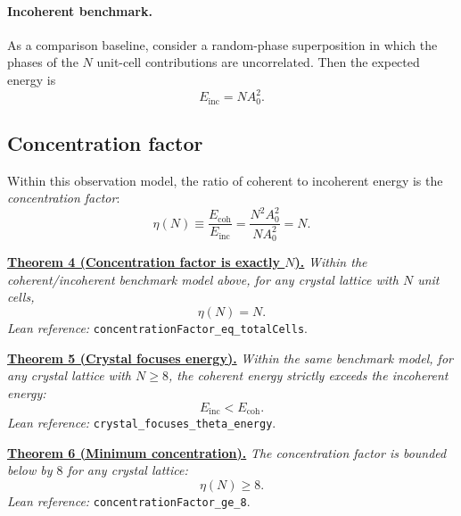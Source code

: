\documentclass[prb,twocolumn,nofootinbib,superscriptaddress]{revtex4-2}
\newcommand{\lean}[1]{\texttt{\small #1}}
\begin{document}
\paragraph{Incoherent benchmark.}
As a comparison baseline, consider a random-phase superposition in which the phases of the $N$ unit-cell contributions are uncorrelated.
Then the expected energy is
\begin{equation}
E_{\mathrm{inc}} = N A_0^2.
\label{eq:E_inc}
\end{equation}

\subsection{Concentration factor}

Within this observation model, the ratio of coherent to incoherent energy is the \emph{concentration factor}:
\begin{equation}
\eta(N) \equiv \frac{E_{\mathrm{coh}}}{E_{\mathrm{inc}}} = \frac{N^2 A_0^2}{N A_0^2} = N.
\label{eq:eta}
\end{equation}

\vspace{2mm}
\underline{\bf Theorem 4 (Concentration factor is exactly $N$).}
\emph{Within the coherent/incoherent benchmark model above, for any crystal lattice with $N$ unit cells,}
\begin{equation}
\eta(N) = N.
\end{equation}
\emph{Lean reference:} \lean{concentrationFactor\_eq\_totalCells}.
\vspace{2mm}

\vspace{2mm}
\underline{\bf Theorem 5 (Crystal focuses energy).}
\emph{Within the same benchmark model, for any crystal lattice with $N \geq 8$, the coherent energy strictly exceeds the incoherent energy:}
\begin{equation}
E_{\mathrm{inc}} < E_{\mathrm{coh}}.
\end{equation}
\emph{Lean reference:} \lean{crystal\_focuses\_theta\_energy}.
\vspace{2mm}

\vspace{2mm}
\underline{\bf Theorem 6 (Minimum concentration).}
\emph{The concentration factor is bounded below by $8$ for any crystal lattice:}
\begin{equation}
\eta(N) \geq 8.
\end{equation}
\emph{Lean reference:} \lean{concentrationFactor\_ge\_8}.
\vspace{2mm}
\end{document}
